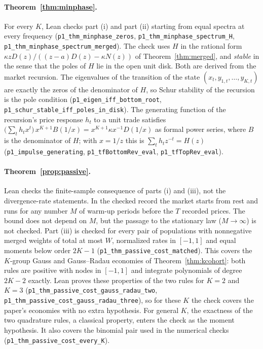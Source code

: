 \documentclass[12pt]{article}
\theoremstyle{definition}
\theoremstyle{remark}
\begin{document}
\paragraph{Theorem~\ref{thm:minphase}.}
For every $K$, Lean checks part (i) and part (ii) starting from equal spectra at every frequency (\texttt{p1\_thm\_minphase\_zeros}, \texttt{p1\_thm\_minphase\_spectrum\_H}, \texttt{p1\_thm\_minphase\_spectrum\_merged}). The check uses $H$ in the rational form $\kappa zD(z)/((z-a)D(z)-\kappa N(z))$ of Theorem~\ref{thm:merged}, and \emph{stable} in the sense that the poles of $H$ lie in the open unit disk. Both are derived from the market recursion. The eigenvalues of the transition of the state $(x_t,y_{1,t},\ldots,y_{K,t})$ are exactly the zeros of the denominator of $H$, so Schur stability of the recursion is the pole condition (\texttt{p1\_eigen\_iff\_bottom\_root}, \texttt{p1\_schur\_stable\_iff\_poles\_in\_disk}). The generating function of the recursion's price response $h_t$ to a unit trade satisfies $\bigl(\sum_th_tx^t\bigr)\,x^{K+1}B(1/x)=x^{K+1}\kappa x^{-1}D(1/x)$ as formal power series, where $B$ is the denominator of $H$; with $x=1/z$ this is $\sum_th_tz^{-t}=H(z)$ (\texttt{p1\_impulse\_generating}, \texttt{p1\_tfBottomRev\_eval}, \texttt{p1\_tfTopRev\_eval}).

\paragraph{Theorem~\ref{prop:passive}.}
Lean checks the finite-sample consequence of parts (i) and (iii), not the divergence-rate statements. In the checked record the market starts from rest and runs for any number $M$ of warm-up periods before the $T$ recorded prices. The bound does not depend on $M$, but the passage to the stationary law ($M\to\infty$) is not checked. Part (iii) is checked for every pair of populations with nonnegative merged weights of total at most $W$, normalized rates in $[-1,1]$ and equal moments below order $2K-1$ (\texttt{p1\_thm\_passive\_cost\_matched}). This covers the $K$-group Gauss and Gauss--Radau economies of Theorem~\ref{thm:kcohort}: both rules are positive with nodes in $[-1,1]$ and integrate polynomials of degree $2K-2$ exactly. Lean proves these properties of the two rules for $K=2$ and $K=3$ (\texttt{p1\_thm\_passive\_cost\_gauss\_radau\_two}, \texttt{p1\_thm\_passive\_cost\_gauss\_radau\_three}), so for these $K$ the check covers the paper's economies with no extra hypothesis. For general $K$, the exactness of the two quadrature rules, a classical property, enters the check as the moment hypothesis. It also covers the binomial pair used in the numerical checks (\texttt{p1\_thm\_passive\_cost\_every\_K}).
\end{document}
